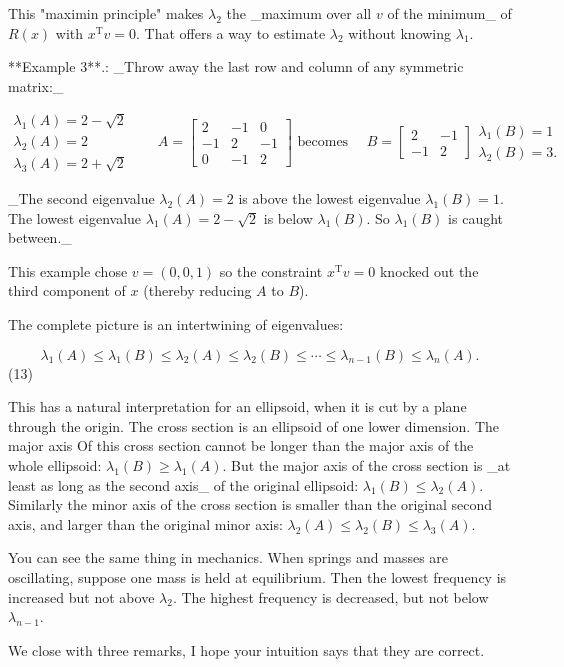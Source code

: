 This "maximin principle" makes \(\lambda_{2}\) the _maximum over all \(v\) of the minimum_ of \(R(x)\) with \(x^{\mathrm{T}}v=0\). That offers a way to estimate \(\lambda_{2}\) without knowing \(\lambda_{1}\).

**Example 3**.: _Throw away the last row and column of any symmetric matrix:_

\[\begin{array}{ll}\lambda_{1}(A)=2-\sqrt{2}&\\ \lambda_{2}(A)=2&\\ \lambda_{3}(A)=2+\sqrt{2}&\end{array}\quad A=\begin{bmatrix}2&-1&0\\ -1&2&-1\\ 0&-1&2\end{bmatrix}\text{ becomes }\quad B=\begin{bmatrix}2&-1\\ -1&2\end{bmatrix}\begin{array}{l}\lambda_{1}(B)=1\\ \lambda_{2}(B)=3.\end{array}\]

_The second eigenvalue \(\lambda_{2}(A)=2\) is above the lowest eigenvalue \(\lambda_{1}(B)=1\). The lowest eigenvalue \(\lambda_{1}(A)=2-\sqrt{2}\) is below \(\lambda_{1}(B)\). So \(\lambda_{1}(B)\) is caught between._

This example chose \(v=(0,0,1)\) so the constraint \(x^{\mathrm{T}}v=0\) knocked out the third component of \(x\) (thereby reducing \(A\) to \(B\)).

The complete picture is an intertwining of eigenvalues:

\[\lambda_{1}(A)\leq\lambda_{1}(B)\leq\lambda_{2}(A)\leq\lambda_{2}(B)\leq \cdots\leq\lambda_{n-1}(B)\leq\lambda_{n}(A).\] (13)

This has a natural interpretation for an ellipsoid, when it is cut by a plane through the origin. The cross section is an ellipsoid of one lower dimension. The major axis Of this cross section cannot be longer than the major axis of the whole ellipsoid: \(\lambda_{1}(B)\geq\lambda_{1}(A)\). But the major axis of the cross section is _at least as long as the second axis_ of the original ellipsoid: \(\lambda_{1}(B)\leq\lambda_{2}(A)\). Similarly the minor axis of the cross section is smaller than the original second axis, and larger than the original minor axis: \(\lambda_{2}(A)\leq\lambda_{2}(B)\leq\lambda_{3}(A)\).

You can see the same thing in mechanics. When springs and masses are oscillating, suppose one mass is held at equilibrium. Then the lowest frequency is increased but not above \(\lambda_{2}\). The highest frequency is decreased, but not below \(\lambda_{n-1}\).

We close with three remarks, I hope your intuition says that they are correct.

 